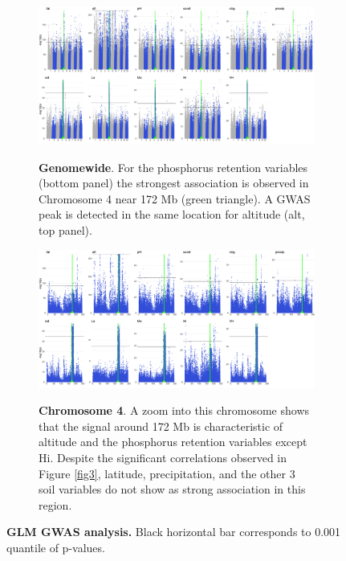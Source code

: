\documentclass[10pt,letterpaper]{article}
\begin{document}
\begin{figure}[p] %

\centering

\begin{subfigure}[b]{\textwidth}
   \includegraphics[width=\linewidth]{fig4.png}
   \label{fig:fig4top} 
   \caption{\textbf{Genomewide}. For the phosphorus retention variables (bottom panel) the strongest association is observed in Chromosome 4 near 172 Mb (green triangle). A GWAS peak is detected in the same location for altitude (alt, top panel).} 

   \bigskip

\end{subfigure} 

\begin{subfigure}[b]{\textwidth}
   \includegraphics[width=\linewidth]{fig5.png}
   \label{fig:fig5top} 
   \caption{\textbf{Chromosome 4}. A zoom into this chromosome shows that the signal around 172 Mb is characteristic of altitude and the phosphorus retention variables except Hi. Despite the significant correlations observed in Figure \ref{fig3}, latitude, precipitation, and the other 3 soil variables do not show as strong association in this region.}
   \bigskip

\end{subfigure} 

\caption{\textbf{GLM GWAS analysis.} Black horizontal bar corresponds to  0.001 quantile of p-values.}
\label{fig5}

\end{figure}
\end{document}
